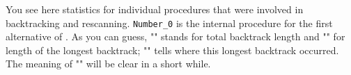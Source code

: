 You see here statistics for individual procedures that were involved
in backtracking and rescanning.
\verb#Number_0# is the internal procedure for the first alternative of \Number.
As you can guess, "" stands for total backtrack length
and "" for length of the longest backtrack; 
"" tells where this longest backtrack occurred.
The meaning of "" will be clear in a short while.
